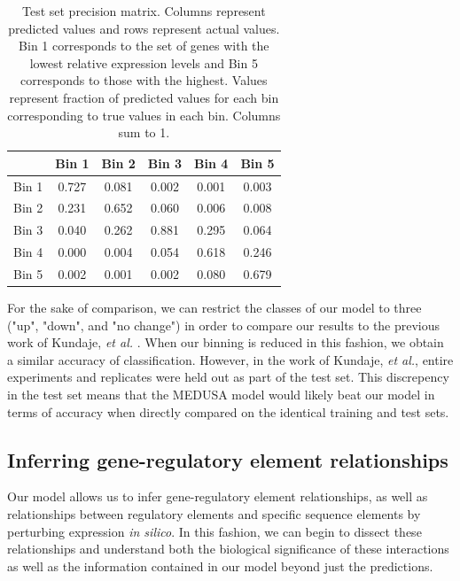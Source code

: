 \documentclass{article}
\begin{document}
	\begin{table}[H]
	\begin{center}
	\begin{tabular}{l|c|c|c|c|c}
	\hline
	  & Bin 1 & Bin 2 & Bin 3 & Bin 4 & Bin 5\\
	\hline
	Bin 1 & 0.727 & 0.081 & 0.002 & 0.001 & 0.003\\
	\hline
	Bin 2 & 0.231 & 0.652 & 0.060 & 0.006 & 0.008\\
	\hline
	Bin 3 & 0.040 & 0.262 & 0.881 & 0.295 & 0.064\\
	\hline
	Bin 4 & 0.000 & 0.004 & 0.054 & 0.618 & 0.246\\
	\hline
	Bin 5 & 0.002 & 0.001 & 0.002 & 0.080 & 0.679\\
	\hline
	\end{tabular}
	\end{center}
	\caption{Test set precision matrix. Columns represent predicted values and rows represent actual values. Bin 1 corresponds to the set of genes with the lowest relative expression levels and Bin 5 corresponds to those with the highest. Values represent fraction of predicted values for each bin corresponding to true values in each bin. Columns sum to 1.}
	\end{table}

For the sake of comparison, we can restrict the classes of our model to three ("up", "down", and "no change") in order to compare our results to the previous work of Kundaje, \textit{et al.} \cite{Kundaje:2007hs}. When our binning is reduced in this fashion, we obtain a similar accuracy of classification. However, in the work of Kundaje, \textit{et al.}, entire experiments and replicates were held out as part of the test set. This discrepency in the test set means that the MEDUSA model would likely beat our model in terms of accuracy when directly compared on the identical training and test sets.

\subsection{Inferring gene-regulatory element relationships}

Our model allows us to infer gene-regulatory element relationships, as well as relationships between regulatory elements and specific sequence elements by perturbing expression \textit{in silico}. In this fashion, we can begin to dissect these relationships and understand both the biological significance of these interactions as well as the information contained in our model beyond just the predictions.
\end{document}
